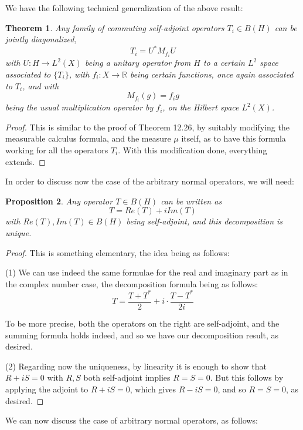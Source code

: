 \documentclass[12pt]{amsbook}
\newtheorem{theorem}{Theorem}[chapter]
\newtheorem{proposition}[theorem]{Proposition}
\begin{document}
We have the following technical generalization of the above result:


\begin{theorem}
Any family of commuting self-adjoint operators $T_i\in B(H)$ can be jointly diagonalized,
$$T_i=U^*M_{f_i}U$$
with $U:H\to L^2(X)$ being a unitary operator from $H$ to a certain $L^2$ space associated to $\{T_i\}$, with $f_i:X\to\mathbb R$ being certain functions, once again associated to $T_i$, and with
$$M_{f_i}(g)=f_ig$$
being the usual multiplication operator by $f_i$, on the Hilbert space $L^2(X)$.
\end{theorem}

\begin{proof}
This is similar to the proof of Theorem 12.26, by suitably modifying the measurable calculus formula, and the measure $\mu$ itself, as to have this formula working for all the operators $T_i$. With this modification done, everything extends.
\end{proof}

In order to discuss now the case of the arbitrary normal operators, we will need:

\begin{proposition}
Any operator $T\in B(H)$ can be written as
$$T=Re(T)+iIm(T)$$
with $Re(T),Im(T)\in B(H)$ being self-adjoint, and this decomposition is unique.
\end{proposition}

\begin{proof}
This is something elementary, the idea being as follows:

\medskip

(1) We can use indeed the same formulae for the real and imaginary part as in the complex number case, the decomposition formula being as follows:
$$T=\frac{T+T^*}{2}+i\cdot\frac{T-T^*}{2i}$$

To be more precise, both the operators on the right are self-adjoint, and the summing formula holds indeed, and so we have our decomposition result, as desired.

\medskip

(2) Regarding now the uniqueness, by linearity it is enough to show that $R+iS=0$ with $R,S$ both self-adjoint implies $R=S=0$. But this follows by applying the adjoint to $R+iS=0$, which gives $R-iS=0$, and so $R=S=0$, as desired.
\end{proof}

We can now discuss the case of arbitrary normal operators, as follows:
\end{document}
